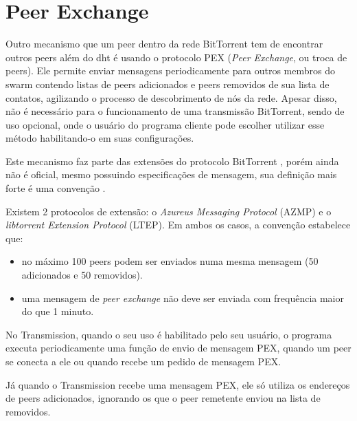 
\section{Peer Exchange}

Outro mecanismo que um \gls*{peer} dentro da rede BitTorrent tem de encontrar outros
\glspl*{peer} além do \gls*{dht} é usando o protocolo PEX (\emph{Peer Exchange}, ou
troca de \glspl*{peer}). Ele permite enviar mensagens periodicamente para outros
membros do \gls*{swarm} contendo listas de \glspl*{peer} adicionados e \glspl*{peer}
removidos de sua lista de contatos, agilizando o processo de descobrimento de nós da
rede. Apesar disso, não é necessário para o funcionamento de uma transmissão BitTorrent,
sendo de uso opcional, onde o usuário do programa cliente pode escolher utilizar esse
método habilitando-o em suas configurações.

Este mecanismo faz parte das extensões do protocolo BitTorrent
\cite{site:bittorrent-extension}, porém ainda não é oficial, mesmo possuindo
especificações de mensagem, sua definição mais forte é uma convenção
\cite{wikitheory:pex}.

Existem 2 protocolos de extensão: o \emph{Azureus Messaging Protocol} (AZMP) e o
\emph{libtorrent Extension Protocol} (LTEP). Em ambos os casos, a convenção estabelece
que:

\begin{itemize}
    \item no máximo 100 \glspl*{peer} podem ser enviados numa mesma mensagem (50
        adicionados e 50 removidos).
    \item uma mensagem de \emph{peer exchange} não deve ser enviada com frequência maior
        do que 1 minuto.
\end{itemize}

No Transmission, quando o seu uso é habilitado pelo seu usuário, o programa executa
periodicamente uma função de envio de mensagem PEX, quando um \gls*{peer} se conecta a
ele ou quando recebe um pedido de mensagem PEX.


Já quando o Transmission recebe uma mensagem PEX, ele só utiliza os endereços de
\glspl*{peer} adicionados, ignorando os que o \gls*{peer} remetente enviou na lista de
removidos.


